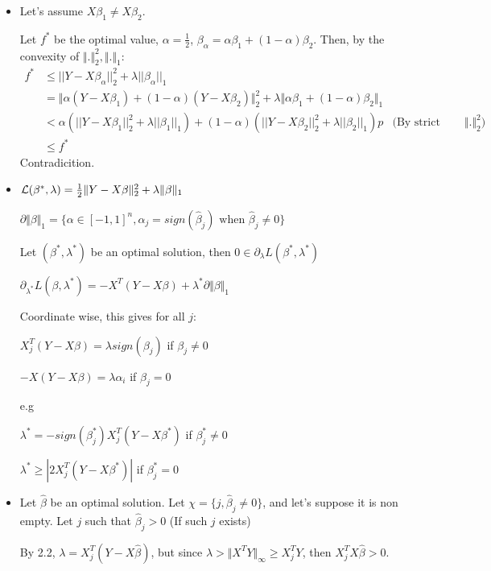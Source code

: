 \documentclass[12pt]{article}
\newcommand{\norm}[1]{\Vert #1 \Vert}
\begin{document}
\begin{itemize}
\item
  Let's assume  $X\beta_1 \ne X\beta_2$.
  
  Let $f^*$ be the optimal value, $\alpha = \frac12$, $\beta_{\alpha} = \alpha \beta_1 + (1-\alpha) \beta_2$.
  Then, by the convexity of $\norm{.}_2^2, \norm{.}_1$:
  \begin{align*}
    f^* &\le ||Y - X \beta_{\alpha}||_2^2 + \lambda ||\beta_{\alpha}||_1
    \\&= \norm{ \alpha (Y - X \beta_1) + (1-\alpha)(Y - X\beta_2)}_2^2
        + \lambda \norm{\alpha \beta_1 + (1-\alpha)\beta_2}_1
    \\&<
        \alpha \left(||Y - X \beta_1||_2^2 + \lambda ||\beta_1||_1\right)
        + (1-\alpha)\left(||Y - X \beta_2||_2^2 + \lambda ||\beta_2||_1\right)p
        &\text{(By strict convexity of $\norm{.}_2^2$)}
    \\&\le f^*
  \end{align*}
  Contradicition.
  
\item
  ${\cal L}(\beta^*, \lambda) = \frac12 \norm{Y-X\beta}_2^2 + \lambda \norm{\beta}_1$

  $\partial \norm{\beta}_1 = \{ \alpha \in [-1, 1]^n, \alpha_j = sign(\hat \beta_j) \text{ when } \hat \beta_j \ne 0\}$
  
  Let $(\beta^*, \lambda^*)$ be an optimal solution, then $0 \in \partial_{\lambda} L (\beta^*, \lambda^*)$

  $\partial_{\lambda^*} L (\beta, \lambda^*) =  -X^T(Y-X\beta) +  \lambda^* \partial \norm{\beta}_1$

  Coordinate wise, this gives for all $j$:
  
  $ X_j^T (Y - X\beta) = \lambda sign(\beta_j)$ if $\beta_j \ne 0$
  
  $ - X (Y - X\beta) = \lambda \alpha_i$ if $\beta_j = 0$
  
  e.g
  
  $ \lambda^* = -sign(\beta_j^*) X_j^T(Y - X\beta^*)$ if $\beta_j^* \ne 0$
  
  $ \lambda^* \ge |2  X_j^T(Y - X\beta^*)|$ if $\beta_j^* = 0$
  

  
\item
  Let $\hat \beta$ be an optimal solution. Let $\chi = \{ j, \hat \beta_j \ne 0 \}$, and let's suppose it is non empty.
  Let $j$ such that $\hat \beta_j > 0$ (If such $j$ exists)
  
  By 2.2,  $\lambda = X_j^T (Y - X \hat \beta)$, but since $\lambda > \norm{X^TY}_{\infty} \ge X_j^TY$, then $X_j^TX\hat \beta > 0$.
  

\end{itemize}
\end{document}

